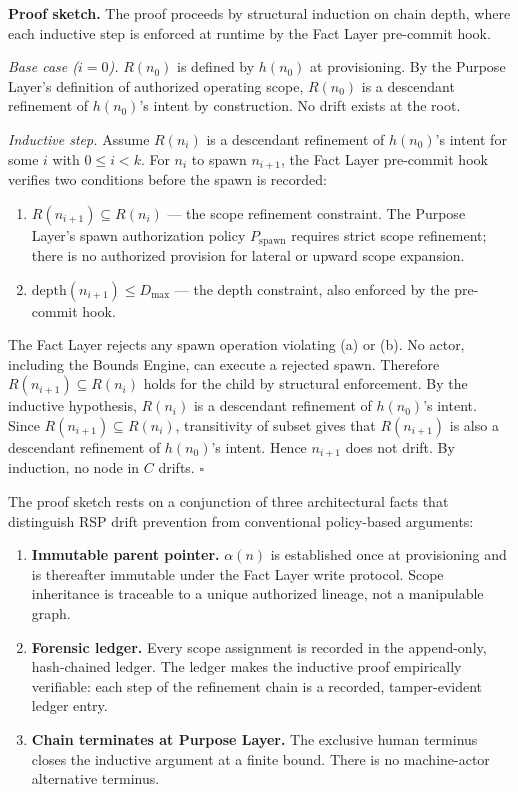 \medskip
\noindent\textbf{Proof sketch.} The proof proceeds by structural induction on chain depth, where each inductive step is enforced at runtime by the Fact Layer pre-commit hook.

\medskip
\textit{Base case ($i=0$).} $R(n_0)$ is defined by $h(n_0)$ at provisioning. By the Purpose Layer's definition of authorized operating scope, $R(n_0)$ is a descendant refinement of $h(n_0)$'s intent by construction. No drift exists at the root.

\medskip
\textit{Inductive step.} Assume $R(n_i)$ is a descendant refinement of $h(n_0)$'s intent for some $i$ with $0 \leq i < k$. For $n_i$ to spawn $n_{i+1}$, the Fact Layer pre-commit hook verifies two conditions before the spawn is recorded:

\begin{enumerate}
    \item[(a)] $R(n_{i+1}) \subseteq R(n_i)$ --- the scope refinement constraint. The Purpose Layer's spawn authorization policy $P_{\mathrm{spawn}}$ requires strict scope refinement; there is no authorized provision for lateral or upward scope expansion.
    \item[(b)] $\mathrm{depth}(n_{i+1}) \leq D_{\mathrm{max}}$ --- the depth constraint, also enforced by the pre-commit hook.
\end{enumerate}

The Fact Layer rejects any spawn operation violating (a) or (b). No actor, including the Bounds Engine, can execute a rejected spawn. Therefore $R(n_{i+1}) \subseteq R(n_i)$ holds for the child by structural enforcement. By the inductive hypothesis, $R(n_i)$ is a descendant refinement of $h(n_0)$'s intent. Since $R(n_{i+1}) \subseteq R(n_i)$, transitivity of subset gives that $R(n_{i+1})$ is also a descendant refinement of $h(n_0)$'s intent. Hence $n_{i+1}$ does not drift. By induction, no node in $C$ drifts. $\square$

\medskip
The proof sketch rests on a conjunction of three architectural facts that distinguish RSP drift prevention from conventional policy-based arguments:

\begin{enumerate}
    \item[(1)] \textbf{Immutable parent pointer.} $\alpha(n)$ is established once at provisioning and is thereafter immutable under the Fact Layer write protocol. Scope inheritance is traceable to a unique authorized lineage, not a manipulable graph.
    \item[(2)] \textbf{Forensic ledger.} Every scope assignment is recorded in the append-only, hash-chained ledger. The ledger makes the inductive proof empirically verifiable: each step of the refinement chain is a recorded, tamper-evident ledger entry.
    \item[(3)] \textbf{Chain terminates at Purpose Layer.} The exclusive human terminus closes the inductive argument at a finite bound. There is no machine-actor alternative terminus.
\end{enumerate}

